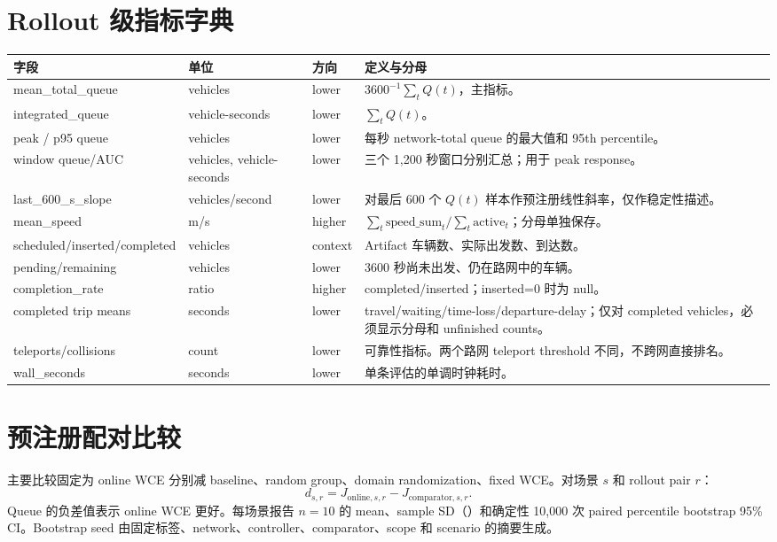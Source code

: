 \section{Rollout 级指标字典}
\begin{longtable}{@{}p{}p{}p{}p{}@{}}
\toprule
字段 & 单位 & 方向 & 定义与分母 \\
\midrule
mean\_total\_queue & vehicles & lower & $3600^{-1}\sum_t Q(t)$，主指标。\\
integrated\_queue & vehicle-seconds & lower & $\sum_tQ(t)$。\\
peak / p95 queue & vehicles & lower & 每秒 network-total queue 的最大值和 95th percentile。\\
window queue/AUC & vehicles, vehicle-seconds & lower & 三个 1,200 秒窗口分别汇总；用于 peak response。\\
last\_600\_s\_slope & vehicles/second & lower & 对最后 600 个 $Q(t)$ 样本作预注册线性斜率，仅作稳定性描述。\\
mean\_speed & m/s & higher & $\sum_t\mathrm{speed\_sum}_t/\sum_t\mathrm{active}_t$；分母单独保存。\\
scheduled/inserted/completed & vehicles & context & Artifact 车辆数、实际出发数、到达数。\\
pending/remaining & vehicles & lower & 3600 秒尚未出发、仍在路网中的车辆。\\
completion\_rate & ratio & higher & completed/inserted；inserted=0 时为 null。\\
completed trip means & seconds & lower & travel/waiting/time-loss/departure-delay；仅对 completed vehicles，必须显示分母和 unfinished counts。\\
teleports/collisions & count & lower & 可靠性指标。两个路网 teleport threshold 不同，不跨网直接排名。\\
wall\_seconds & seconds & lower & 单条评估的单调时钟耗时。\\
\bottomrule
\end{longtable}

\section{预注册配对比较}
主要比较固定为 online WCE 分别减 baseline、random group、domain randomization、fixed WCE。对场景 $s$ 和 rollout pair $r$：
\[
d_{s,r}=J_{\mathrm{online},s,r}-J_{\mathrm{comparator},s,r}.
\]
Queue 的负差值表示 online WCE 更好。每场景报告 $n=10$ 的 mean、sample SD（）和确定性 10,000 次 paired percentile bootstrap 95\% CI。Bootstrap seed 由固定标签、network、controller、comparator、scope 和 scenario 的摘要生成。

